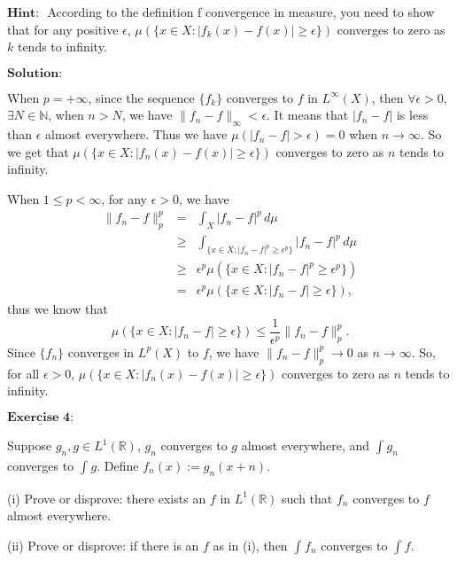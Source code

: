 \documentclass[12pt,a4paper]{ctexart}
\begin{document}
$\textbf{Hint: }$ According to the definition f convergence in measure, you need to show that for any positive $\epsilon$, $\mu(\{x \in X: |f_{k}(x) - f(x)| \geq \epsilon \})$ converges to zero as $k$ tends to infinity.

\vspace{8pt}
$\textbf{Solution:}$

When $p = + \infty$, since the sequence $\{f_{k}\}$ converges to $f$ in $L^{\infty} (X)$, then $\forall \epsilon > 0$, $\exists N \in \mathbb{N}$, when $n > N$, we have $\|f_{n} - f\|_{\infty} < \epsilon$. It means that $|f_{n} - f|$ is less than $\epsilon$ almost everywhere. Thus we have $\mu(|f_{n} - f| > \epsilon) = 0$ when $n \to \infty$. So we get that $\mu(\{x \in X: |f_{n}(x) - f(x)| \geq \epsilon \})$ converges to zero as $n$ tends to infinity.

When $1 \leq p < \infty$, for any $\epsilon > 0$, we have
\begin{eqnarray*}
\|f_{n} - f\|_{p}^{p} & = & \int_{X}^{} |f_{n} - f|^{p} \, d \mu \\
& \geq & \int_{\{x \in X: |f_{n} - f|^{p} \geq \epsilon^{p}\}}^{} |f_{n} - f|^{p}  \, d \mu \\
& \geq & \epsilon^{p} \mu(\{x \in X: |f_{n} - f|^{p} \geq \epsilon^{p} \})  \\
& = & \epsilon^{p} \mu(\{x \in X: |f_{n} - f| \geq \epsilon \}),
\end{eqnarray*}
thus we know that
\begin{equation*}
   \mu(\{x \in X: |f_{n} - f| \geq \epsilon \}) \leq \frac{1}{\epsilon^{p}} \| f_{n} - f \|_{p}^{p}.
\end{equation*}
Since $\{f_{n}\}$ converges in $L^{p}(X)$ to $f$, we have $\|f_{n} - f \|_{p}^{p} \to 0$ as $n \to \infty$. So, for all $\epsilon > 0$, $\mu(\{x \in X: |f_{n}(x) - f(x)| \geq \epsilon \})$ converges to zero as $n$ tends to infinity.


\newpage

$\underline{\textbf{Exercise 4:}}$

Suppose $g_{n}, g \in L^{1}(\mathbb{R})$, $g_{n}$ converges to $g$ almost everywhere, and $\int_{}^{} g_{n} $ converges to $\int_{}^{} g$. Define $f_{n}(x) := g_{n}(x + n)$.

(i) Prove or disprove: there exists an $f$ in $L^{1}(\mathbb{R})$ such that $f_{n}$ converges to $f$ almost everywhere.

(ii) Prove or disprove: if there is an $f$ as in (i), then $\int_{}^{} f_{n}$ converges to $\int_{}^{} f$.
\end{document}

